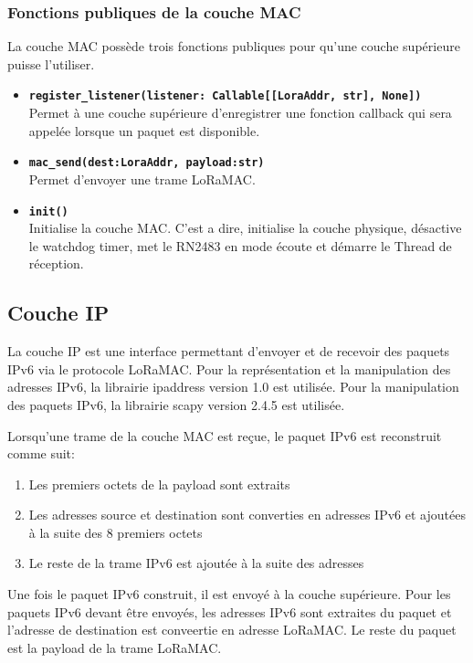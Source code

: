     \subsubsection*{Fonctions publiques de la couche MAC}
        La couche MAC possède trois fonctions publiques pour qu'une couche supérieure puisse l'utiliser.
        \begin{itemize}
            \item \textbf{\texttt{register\_listener(listener: Callable[[LoraAddr, str], None])}}\\
                Permet à une couche supérieure d'enregistrer une fonction callback qui sera appelée lorsque un paquet est disponible.
            \item \textbf{\texttt{mac\_send(dest:LoraAddr, payload:str)}}\\
                Permet d'envoyer une trame LoRaMAC.
            \item \textbf{\texttt{init()}}\\
                Initialise la couche MAC. C'est a dire, initialise la couche physique,
                désactive le watchdog timer, met le RN2483 en mode écoute et démarre le Thread de réception.
        \end{itemize}
        
\subsection*{Couche IP}\label{subsec:work-loraroot:iplayer}
        La couche IP est une interface permettant d'envoyer et de recevoir des paquets IPv6 via le protocole LoRaMAC. Pour la représentation et la manipulation des adresses IPv6, la librairie ipaddress version 1.0 est utilisée. Pour la manipulation des paquets IPv6, la librairie scapy version 2.4.5 est utilisée.

        Lorsqu'une trame de la couche MAC est reçue, le paquet IPv6 est reconstruit comme suit:
        \begin{enumerate}
            \item Les premiers octets de la payload sont extraits
            \item Les adresses source et destination sont converties en adresses IPv6 et ajoutées à la suite des 8 premiers octets
            \item Le reste de la trame IPv6 est ajoutée à la suite des adresses
        \end{enumerate}
        
        Une fois le paquet IPv6 construit, il est envoyé à la couche supérieure.
        Pour les paquets IPv6 devant être envoyés, les adresses IPv6 sont extraites du paquet et l'adresse de destination est conveertie en adresse LoRaMAC. Le reste du paquet est la payload de la trame LoRaMAC.

